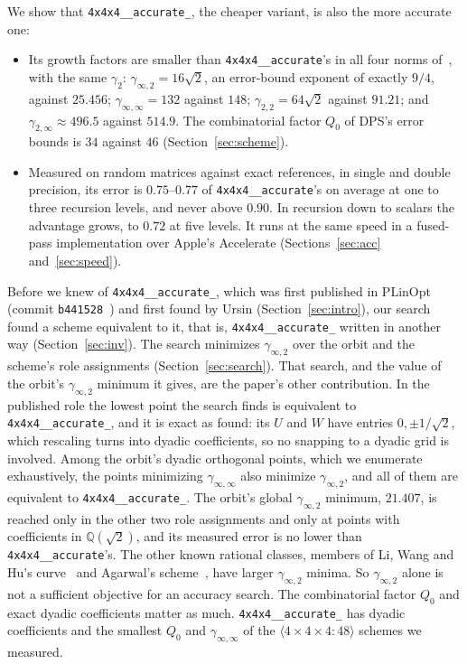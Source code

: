 \documentclass[11pt]{article}
\theoremstyle{remark}
\newcommand{\Q}{\mathbb{Q}}
\newcommand{\ginf}{\gamma_{\infty,2}}
\newcommand{\giinf}{\gamma_{\infty,\infty}}
\newcommand{\mm}[1]{\langle #1\rangle}
\newcommand{\acc}{\texttt{4x4x4\_\allowbreak 48\_\allowbreak accurate}\xspace}
\newcommand{\acct}{\texttt{4x4x4\_\allowbreak 48\_\allowbreak accurate\_\allowbreak 262}\xspace}
\begin{document}
We show that \acct, the cheaper variant, is also the more accurate one:
\begin{itemize}
\item Its growth factors are smaller than \acc's in all four norms
  of~\cite[Table~2]{DPS26a}, with the same $\gamma_2$: $\ginf=16\sqrt2$,
  an error-bound exponent of exactly $9/4$, against $25.456$;
  $\giinf=132$ against $148$; $\gamma_{2,2}=64\sqrt2$ against $91.21$;
  and $\gamma_{2,\infty}\approx496.5$ against $514.9$.  The combinatorial
  factor $Q_0$ of DPS's error bounds is $34$ against $46$ (Section~\ref{sec:scheme}).
\item Measured on random matrices against exact references, in single
  and double precision, its error is $0.75$--$0.77$ of \acc's on average at one to
  three recursion levels, and never above $0.90$.  In recursion down to
  scalars the advantage grows, to $0.72$ at five levels.  It runs at the same speed in a fused-pass
  implementation over Apple's Accelerate (Sections~\ref{sec:acc}
  and~\ref{sec:speed}).
\end{itemize}

Before we knew of \acct, which was first published in PLinOpt (commit
\texttt{b441528}~\cite{PLinOpt}) and first found by Ursin
(Section~\ref{sec:intro}), our search found a scheme equivalent
to it, that is, \acct written in another way (Section~\ref{sec:inv}).
The search minimizes $\ginf$ over the orbit and the scheme's role
assignments (Section~\ref{sec:search}).  That search, and the value of
the orbit's $\ginf$ minimum it gives, are the paper's other
contribution.  In the published role the lowest point the search finds
is equivalent to \acct, and it is exact as found: its $U$ and $W$ have entries
$0,\pm1/\sqrt2$, which rescaling turns into dyadic coefficients, so no
snapping to a dyadic grid is involved.  Among the orbit's dyadic orthogonal points, which we
enumerate exhaustively, the points minimizing $\giinf$ also minimize
$\ginf$, and all of them are equivalent to \acct.  The orbit's global $\ginf$ minimum, $21.407$, is reached only
in the other two role assignments and only
at points with coefficients in $\Q(\sqrt2)$, and its measured error is
no lower than \acc's.  The other known rational classes, members of Li, Wang
and Hu's curve~\cite{LWH26} and Agarwal's scheme~\cite{Agarwal26}, have
larger $\ginf$ minima.  So $\ginf$ alone is not a sufficient objective
for an accuracy search.  The combinatorial factor $Q_0$ and exact
dyadic coefficients matter as much.  \acct has dyadic coefficients and
the smallest $Q_0$ and $\giinf$ of the $\mm{4\times4\times4:48}$ schemes
we measured.
\end{document}
